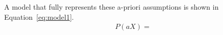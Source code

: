 A model that fully represents these a-priori assumptions is shown in Equation~\ref{eq:model1}.
\begin{align}
    P(aX) = 
\end{align}
